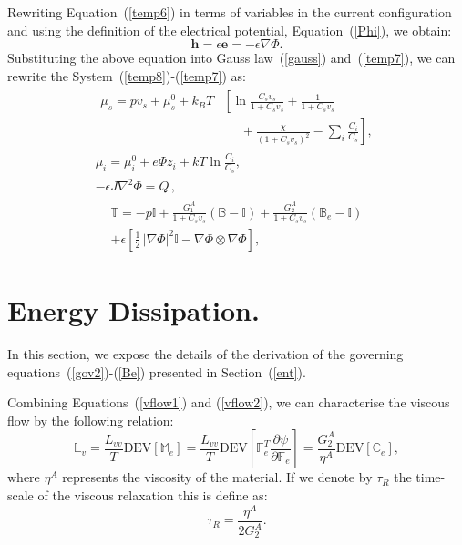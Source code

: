 \documentclass[runningheads]{llncs}
\newcommand{\F}{\ensuremath{\mathbb{F}}}
\newcommand{\LL}{\ensuremath{\mathbb{L}}}
\begin{document}
Rewriting Equation~(\ref{temp6}) in terms of variables in the current configuration and using the definition of the electrical potential, Equation~(\ref{Phi}), we obtain:
\begin{equation}
\mathbf{h}=\epsilon \mathbf{e}=-\epsilon \nabla \Phi.
\end{equation}
Substituting the above equation into Gauss law~(\ref{gauss}) and~(\ref{temp7}), we can rewrite the System~(\ref{temp8})-(\ref{temp7}) as:
\begin{gather}
\begin{aligned}
\mu_s = p v_s + \mu_s^0 + k_BT&\left[\ln \frac{C_s v_s}{1+C_s v_s} + \frac{1}{1+C_sv_s}\right.\\
&\left.\ \ \ \ \ \ +\frac{\chi}{(1+C_s v_s)^2}-\sum_i \frac{C_i}{C_s}\right], 
\end{aligned}\\[2.5mm]
\mu_i = \mu^0_i + e\Phi z_i + kT \ln \frac{C_i}{C_s},\\
-\epsilon J \nabla^2 \Phi = Q\, ,
\end{gather}
\begin{gather}
\begin{aligned}
\mathbb{T}= -p \mathbb{I}+ \frac{G^A_1}{1+C_sv_s}\left(\mathbb{B}-\mathbb{I}\right) + \frac{G^A_2}{1+C_sv_s}\left(\mathbb{B}_e-\mathbb{I}\right) \\
+\epsilon \left[\frac{1}{2} \,|\nabla \Phi|^2\mathbb{I} -\nabla \Phi \otimes \nabla \Phi\right],
\end{aligned}
\end{gather}
\section{Energy Dissipation.}
\label{apenergy}
In this section, we expose the details of the derivation of the governing equations~(\ref{gov2})-(\ref{Be}) presented in Section~(\ref{ent}).

Combining Equations~(\ref{vflow1}) and (\ref{vflow2}), we can characterise the viscous flow by the following relation:
\begin{equation}
\LL_v = \frac{L_{vv}}{T}\text{DEV}[\mathbb{M}_e]= \frac{L_{vv}}{T}\text{DEV}\left[\F_e^T\frac{\partial \psi}{\partial \F_e}\right] = \frac{G^A_2}{\eta^A}\text{DEV}\left[\mathbb{C}_e\right] ,\label{Lv1}
\end{equation}
where $\eta^A$ represents the viscosity of the material. If we denote by $\tau_R$ the time-scale of the viscous relaxation this is define as:
\begin{equation}
\tau_R = \frac{\eta^A}{2G^A_2}.\label{tau}
\end{equation}
\end{document}
